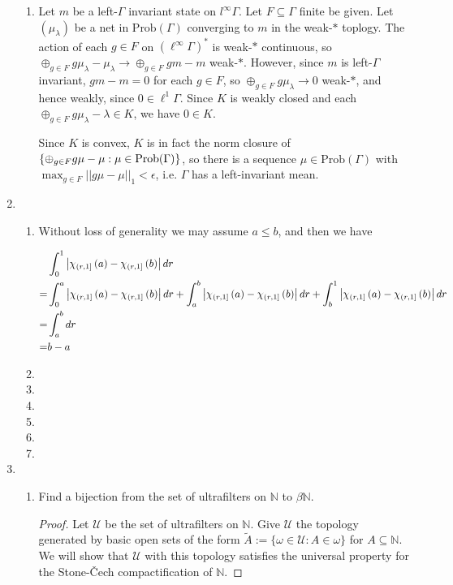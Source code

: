 \documentclass[a4paper,10pt]{report}
\newcommand{\pn}[2]{||#1||_{#2}}
\DeclarePairedDelimiter{\set}{\{}{\}}
\newcommand{\N}{\mathbb{N}}
\begin{document}
\begin{enumerate}
\begin{enumerate}
			\item Let $m$ be a left-$\Gamma$ invariant state on $l^\infty\Gamma$. Let $F\subseteq\Gamma$ finite be given. Let $(\mu_\lambda)$ be a net in $\text{Prob}(\Gamma)$ converging to $m$ in the weak-$*$ toplogy. The action of each $g\in F$ on $(\ell^\infty\Gamma)^*$ is weak-$*$ continuous, so $\oplus_{g\in F}g\mu_\lambda-\mu_\lambda\to\oplus_{g\in F}gm-m$ weak-$*$. However, since $m$ is left-$\Gamma$ invariant, $gm-m=0$ for each $g\in F$, so $\oplus_{g\in F}g\mu_\lambda\to 0$ weak-$*$, and hence weakly, since $0\in\ell^1\Gamma$. Since $K$ is weakly closed and each $\oplus_{g\in F}g\mu_\lambda-\lambda\in K$, we have $0\in K$. 
				
				Since $K$ is convex, $K$ is in fact the norm closure of $\set{\oplus_{g\in F}g\mu-\mu:\mu\in\text{Prob}(\Gamma)}$, so there is a sequence $\mu\in\text{Prob}(\Gamma)$ with $\max_{g\in F}\pn{g\mu-\mu}{1}<\epsilon$, i.e. $\Gamma$ has a left-invariant mean. 
		\end{enumerate}
	\item
		\begin{enumerate}
		\item Without loss of generality we may assume $a \leq b$, and then we have

                  \begin{align*}
                    &\int_0^1 \left| \chi_{\left( r , 1 \right]} \left( a \right) - \chi_{\left( r , 1 \right]} \left( b \right) \right| dr\\
                    =& \int_0^a \left| \chi_{\left( r , 1 \right]} \left( a \right) - \chi_{\left( r , 1 \right]} \left( b \right) \right| dr + \int_a^b \left| \chi_{\left( r , 1 \right]} \left( a \right) - \chi_{\left( r , 1 \right]} \left( b \right) \right| dr + \int_b^1 \left| \chi_{\left( r , 1 \right]} \left( a \right) - \chi_{\left( r , 1 \right]} \left( b \right) \right| dr\\
                    =& \int_a^b dr\\
                    =& b - a
                  \end{align*}
			\item 
			\item 
			\item 
			\item 
			\item 
			\item 
		\end{enumerate}
	\item
		\begin{enumerate}
			\item Find a bijection from the set of ultrafilters on $\N$ to $\beta\N$.
				\begin{proof}
					Let $\mathscr{U}$ be the set of ultrafilters on $\N$.
					Give $\mathscr{U}$ the topology generated by basic open sets of the form
					$\widetilde{A} := \{\omega \in \mathscr{U} : A \in \omega\}$ for $A \subseteq \N$.
					We will show that $\mathscr{U}$ with this topology satisfies the universal
					property for the Stone-\v{C}ech compactification of $\N$.
					

\end{proof}
\end{enumerate}
\end{enumerate}
\end{document}
